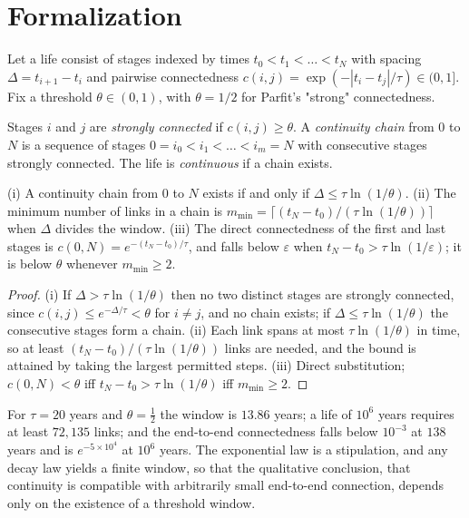 \section*{Formalization}

Let a life consist of stages indexed by times $t_0<t_1<\dots<t_N$ with spacing $\Delta=t_{i+1}-t_i$ and pairwise connectedness $c(i,j)=\exp(-|t_i-t_j|/\tau)\in(0,1]$. Fix a threshold $\theta\in(0,1)$, with $\theta=1/2$ for Parfit's "strong" connectedness.

\begin{definition}[Continuity]
Stages $i$ and $j$ are \emph{strongly connected} if $c(i,j)\ge\theta$. A \emph{continuity chain} from $0$ to $N$ is a sequence of stages $0=i_0<i_1<\dots<i_m=N$ with consecutive stages strongly connected. The life is \emph{continuous} if a chain exists.
\end{definition}

\begin{proposition}
(i) A continuity chain from $0$ to $N$ exists if and only if $\Delta\le\tau\ln(1/\theta)$. (ii) The minimum number of links in a chain is $m_{\min}=\lceil (t_N-t_0)/(\tau\ln(1/\theta))\rceil$ when $\Delta$ divides the window. (iii) The direct connectedness of the first and last stages is $c(0,N)=e^{-(t_N-t_0)/\tau}$, and falls below $\varepsilon$ when $t_N-t_0>\tau\ln(1/\varepsilon)$; it is below $\theta$ whenever $m_{\min}\ge2$.
\end{proposition}

\begin{proof}
(i) If $\Delta>\tau\ln(1/\theta)$ then no two distinct stages are strongly connected, since $c(i,j)\le e^{-\Delta/\tau}<\theta$ for $i\ne j$, and no chain exists; if $\Delta\le\tau\ln(1/\theta)$ the consecutive stages form a chain. (ii) Each link spans at most $\tau\ln(1/\theta)$ in time, so at least $(t_N-t_0)/(\tau\ln(1/\theta))$ links are needed, and the bound is attained by taking the largest permitted steps. (iii) Direct substitution; $c(0,N)<\theta$ iff $t_N-t_0>\tau\ln(1/\theta)$ iff $m_{\min}\ge2$.
\end{proof}

For $\tau=20$ years and $\theta=\tfrac12$ the window is $13.86$ years; a life of $10^6$ years requires at least $72{,}135$ links; and the end-to-end connectedness falls below $10^{-3}$ at $138$ years and is $e^{-5\times10^4}$ at $10^6$ years. The exponential law is a stipulation, and any decay law yields a finite window, so that the qualitative conclusion, that continuity is compatible with arbitrarily small end-to-end connection, depends only on the existence of a threshold window.

